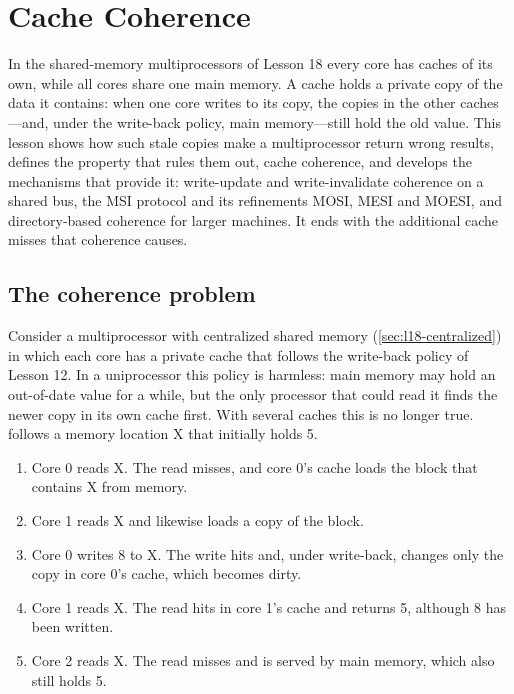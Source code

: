 \documentclass[../main.tex]{subfiles}
\begin{document}
\chapter{Cache Coherence}

In the shared-memory multiprocessors of Lesson 18 every core has caches of
its own, while all cores share one main memory.  A cache holds a private copy
of the data it contains: when one core writes to its copy, the copies in the
other caches---and, under the write-back policy, main memory---still hold the
old value.  This lesson shows how such stale copies make a multiprocessor
return wrong results, defines the property that rules them out, cache
coherence, and develops the mechanisms that provide it: write-update and
write-invalidate coherence on a shared bus, the MSI protocol and its
refinements MOSI, MESI and MOESI, and directory-based coherence for larger
machines.  It ends with the additional cache misses that coherence
causes.

\section{The coherence problem}
\label{sec:l19-problem}

Consider a multiprocessor with centralized shared memory
(\cref{sec:l18-centralized}) in which each core has a private cache that
follows the write-back policy of Lesson 12.  In a uniprocessor this policy is harmless: main memory may hold
an out-of-date value for a while, but the only processor that could read it
finds the newer copy in its own cache first.  With several caches this is no
longer true.   follows a memory location X that
initially holds 5.
\begin{enumerate}
  \item Core 0 reads X.  The read misses, and core 0's cache loads the block
    that contains X from memory.
  \item Core 1 reads X and likewise loads a copy of the block.
  \item Core 0 writes 8 to X.  The write hits and, under write-back, changes
    only the copy in core 0's cache, which becomes dirty.
  \item Core 1 reads X.  The read hits in core 1's cache and returns 5,
    although 8 has been written.
  \item Core 2 reads X.  The read misses and is served by main memory, which
    also still holds 5.
\end{enumerate}
\end{document}
